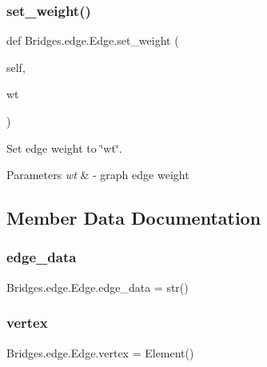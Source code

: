 \subsubsection{\texorpdfstring{set\+\_\+weight()}{set\_weight()}}
{\footnotesize\ttfamily def Bridges.\+edge.\+Edge.\+set\+\_\+weight (\begin{DoxyParamCaption}\item[{}]{self,  }\item[{}]{wt }\end{DoxyParamCaption})}



Set edge weight to \char`\"{}wt\char`\"{}. 


\begin{DoxyParams}{Parameters}
{\em wt} & -\/ graph edge weight \\
\hline
\end{DoxyParams}


\subsection{Member Data Documentation}
\mbox{\label{class_bridges_1_1edge_1_1_edge_a7677bdbf69f6a1725be3bb79e2bb1c7e}} 
\subsubsection{\texorpdfstring{edge\+\_\+data}{edge\_data}}
{\footnotesize\ttfamily Bridges.\+edge.\+Edge.\+edge\+\_\+data = str()\hspace{0.3cm}{\ttfamily [static]}}

\mbox{\label{class_bridges_1_1edge_1_1_edge_a785d6e63ec4a7ec1b49c9e4a81a802dc}} 
\subsubsection{\texorpdfstring{vertex}{vertex}}
{\footnotesize\ttfamily Bridges.\+edge.\+Edge.\+vertex = Element()\hspace{0.3cm}{\ttfamily [static]}}

